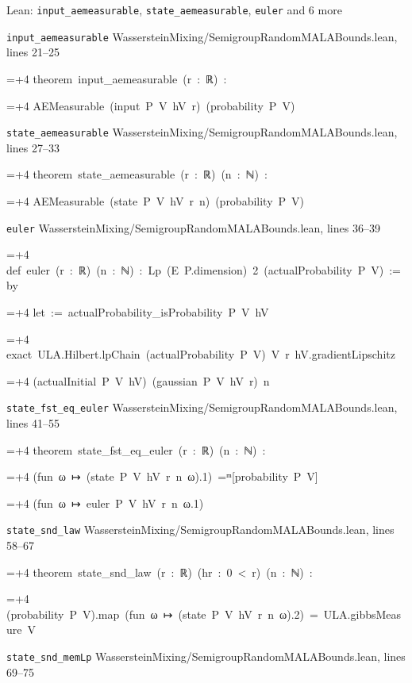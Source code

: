 \documentclass[11pt,a4paper]{report}
\newlength{\leancharwidth}
\newenvironment{leancode}{\par\smallskip\begingroup\ttfamily\footnotesize\raggedright
  \settowidth{\leancharwidth}{M}\setlength{\parskip}{0pt}\setlength{\parindent}{0pt}
  \frenchspacing}{\par\endgroup\smallskip}
\newcommand{\leanline}[2]{\hangindent=\dimexpr#1\leancharwidth+4\leancharwidth\relax
  \hangafter=1\noindent\hspace*{#1\leancharwidth}#2\par}
\newcommand{\leansource}[1]{\par{\footnotesize\color{leanmuted}#1}\par}
\begin{document}
\begin{leanbox}{Lean: \texttt{input\_\allowbreak{}aemeasurable}, \texttt{state\_\allowbreak{}aemeasurable}, \texttt{euler} and 6 more}
\leansource{\texttt{input\_\allowbreak{}aemeasurable} \quad WassersteinMixing/\allowbreak{}SemigroupRandomMALABounds.lean, lines 21–25}
\begin{leancode}
\leanline{0}{theorem\ input\_aemeasurable\ (r\ :\ ℝ)\ :}
\leanline{4}{AEMeasurable\ (input\ P\ V\ hV\ r)\ (probability\ P\ V)}
\end{leancode}
\leansource{\texttt{state\_\allowbreak{}aemeasurable} \quad WassersteinMixing/\allowbreak{}SemigroupRandomMALABounds.lean, lines 27–33}
\begin{leancode}
\leanline{0}{theorem\ state\_aemeasurable\ (r\ :\ ℝ)\ (n\ :\ ℕ)\ :}
\leanline{4}{AEMeasurable\ (state\ P\ V\ hV\ r\ n)\ (probability\ P\ V)}
\end{leancode}
\leansource{\texttt{euler} \quad WassersteinMixing/\allowbreak{}SemigroupRandomMALABounds.lean, lines 36–39}
\begin{leancode}
\leanline{0}{def\ euler\ (r\ :\ ℝ)\ (n\ :\ ℕ)\ :\ Lp\ (E\ P.dimension)\ 2\ (actualProbability\ P\ V)\ :=\ by}
\leanline{2}{let\ :=\ actualProbability\_isProbability\ P\ V\ hV}
\leanline{2}{exact\ ULA.Hilbert.lpChain\ (actualProbability\ P\ V)\ V\ r\ hV.gradientLipschitz}
\leanline{4}{(actualInitial\ P\ V\ hV)\ (gaussian\ P\ V\ hV\ r)\ n}
\end{leancode}
\leansource{\texttt{state\_\allowbreak{}fst\_\allowbreak{}eq\_\allowbreak{}euler} \quad WassersteinMixing/\allowbreak{}SemigroupRandomMALABounds.lean, lines 41–55}
\begin{leancode}
\leanline{0}{theorem\ state\_fst\_eq\_euler\ (r\ :\ ℝ)\ (n\ :\ ℕ)\ :}
\leanline{4}{(fun\ ω\ ↦\ (state\ P\ V\ hV\ r\ n\ ω).1)\ =ᵐ[probability\ P\ V]}
\leanline{6}{(fun\ ω\ ↦\ euler\ P\ V\ hV\ r\ n\ ω.1)}
\end{leancode}
\leansource{\texttt{state\_\allowbreak{}snd\_\allowbreak{}law} \quad WassersteinMixing/\allowbreak{}SemigroupRandomMALABounds.lean, lines 58–67}
\begin{leancode}
\leanline{0}{theorem\ state\_snd\_law\ (r\ :\ ℝ)\ (hr\ :\ 0\ <\ r)\ (n\ :\ ℕ)\ :}
\leanline{4}{(probability\ P\ V).map\ (fun\ ω\ ↦\ (state\ P\ V\ hV\ r\ n\ ω).2)\ =\ ULA.gibbsMeasure\ V}
\end{leancode}
\leansource{\texttt{state\_\allowbreak{}snd\_\allowbreak{}memLp} \quad WassersteinMixing/\allowbreak{}SemigroupRandomMALABounds.lean, lines 69–75}
\begin{leancode}

\end{leancode}
\end{leanbox}
\end{document}
